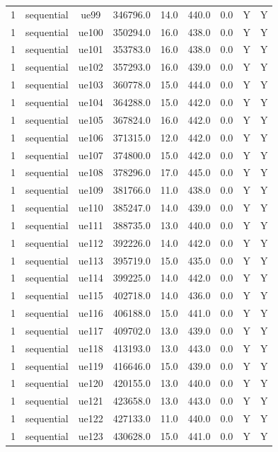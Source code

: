 \begin{table}[ht]
\begin{tabular}{|c|c|c|c|c|c|c|c|c|}
1 & sequential & ue99 & 346796.0 & 14.0 & 440.0 & 0.0 & Y & Y \\
1 & sequential & ue100 & 350294.0 & 16.0 & 438.0 & 0.0 & Y & Y \\
1 & sequential & ue101 & 353783.0 & 16.0 & 438.0 & 0.0 & Y & Y \\
1 & sequential & ue102 & 357293.0 & 16.0 & 439.0 & 0.0 & Y & Y \\
1 & sequential & ue103 & 360778.0 & 15.0 & 444.0 & 0.0 & Y & Y \\
1 & sequential & ue104 & 364288.0 & 15.0 & 442.0 & 0.0 & Y & Y \\
1 & sequential & ue105 & 367824.0 & 16.0 & 442.0 & 0.0 & Y & Y \\
1 & sequential & ue106 & 371315.0 & 12.0 & 442.0 & 0.0 & Y & Y \\
1 & sequential & ue107 & 374800.0 & 15.0 & 442.0 & 0.0 & Y & Y \\
1 & sequential & ue108 & 378296.0 & 17.0 & 445.0 & 0.0 & Y & Y \\
1 & sequential & ue109 & 381766.0 & 11.0 & 438.0 & 0.0 & Y & Y \\
1 & sequential & ue110 & 385247.0 & 14.0 & 439.0 & 0.0 & Y & Y \\
1 & sequential & ue111 & 388735.0 & 13.0 & 440.0 & 0.0 & Y & Y \\
1 & sequential & ue112 & 392226.0 & 14.0 & 442.0 & 0.0 & Y & Y \\
1 & sequential & ue113 & 395719.0 & 15.0 & 435.0 & 0.0 & Y & Y \\
1 & sequential & ue114 & 399225.0 & 14.0 & 442.0 & 0.0 & Y & Y \\
1 & sequential & ue115 & 402718.0 & 14.0 & 436.0 & 0.0 & Y & Y \\
1 & sequential & ue116 & 406188.0 & 15.0 & 441.0 & 0.0 & Y & Y \\
1 & sequential & ue117 & 409702.0 & 13.0 & 439.0 & 0.0 & Y & Y \\
1 & sequential & ue118 & 413193.0 & 13.0 & 443.0 & 0.0 & Y & Y \\
1 & sequential & ue119 & 416646.0 & 15.0 & 439.0 & 0.0 & Y & Y \\
1 & sequential & ue120 & 420155.0 & 13.0 & 440.0 & 0.0 & Y & Y \\
1 & sequential & ue121 & 423658.0 & 13.0 & 443.0 & 0.0 & Y & Y \\
1 & sequential & ue122 & 427133.0 & 11.0 & 440.0 & 0.0 & Y & Y \\
1 & sequential & ue123 & 430628.0 & 15.0 & 441.0 & 0.0 & Y & Y \\

\end{tabular}
\end{table}
